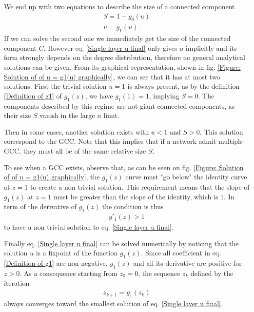 \documentclass[
11pt, %
english, %
singlespacing, %
nolistspacing, %
liststotoc, %
headsepline, %
]{MastersDoctoralThesis} %
\begin{document}
We end up with two equations to describe the size of a connected component
\begin{align}
	S = 1 - g_0(u) \label{Single layer S final} \\
	u = g_1(u). \label{Single layer u final}
\end{align}
If we can solve the second one we immediately get the size of the connected component $C$. However eq. \eqref{Single layer u final} only gives $u$ implicitly and its form strongly depends on the degree distribution, therefore no general analytical solutions can be given. From its graphical representation, shown in fig. \ref{Figure: Solution of of u = g1(u) graphically}, we can see that it has at most two solutions. First the trivial solution $u = 1$ is always present, as by the definition \eqref{Definition of g1} of $g_1(z)$, we have $g_1(1) = 1$, implying $S = 0$. The components described by this regime are not giant connected components, as their size $S$ vanish in the large $n$ limit.

Then in some cases, another solution exists with $u < 1$ and $S > 0$. This solution correspond to the GCC. Note that this implies that if a network admit multiple GCC, they must all be of the same relative size $S$.


To see when a GCC exists, observe that, as can be seen on fig. \ref{Figure: Solution of of u = g1(u) graphically}, the $g_1(z)$ curve must "go below" the identity curve at $z = 1$ to create a non trivial solution. This requirement means that the slope of $g_1(z)$ at $z = 1$ must be greater than the slope of the identity, which is $1$. In term of the derivative of $g_1(z)$ the condition is thus
\begin{align}
	g'_1(z) > 1 \label{Boundary condition for single layer}
\end{align}
to have a non trivial solution to eq. \eqref{Single layer u final}.

Finally eq. \eqref{Single layer u final} can be solved numerically by noticing that the solution $u$ is a fixpoint of the function $g_1(z)$. Since all coefficient in eq. \eqref{Definition of g1} are non negative, $g_1(z)$ and all its derivative are positive for $z > 0$. As a consequence starting from $z_0 = 0$, the sequence $z_k$ defined by the iteration
\begin{align}
	z_{k + 1}  = g_1(z_k)  \label{Single layer fixpoint g1 iteration}
\end{align}
always converges toward the smallest solution of eq. \eqref{Single layer u final}.
\end{document}
